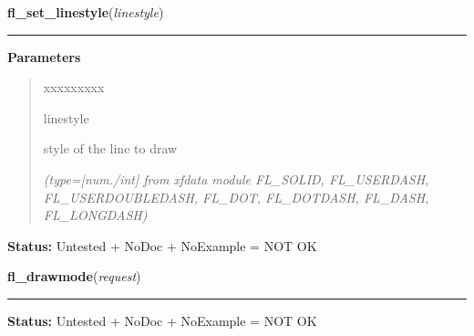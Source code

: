 \hspace{.8\funcindent}\begin{boxedminipage}{\funcwidth}

    \raggedright \textbf{fl\_set\_linestyle}(\textit{linestyle})

    \vspace{-1.5ex}

    \rule{\textwidth}{0.5\fboxrule}
\setlength{\parskip}{2ex}
\setlength{\parskip}{1ex}
      \textbf{Parameters}
      \vspace{-1ex}

      \begin{quote}
        \begin{Ventry}{xxxxxxxxx}

          \item[linestyle]

          style of the line to draw

            {\it (type=[num./int] from xfdata module FL\_SOLID, FL\_USERDASH, FL\_USERDOUBLEDASH, 
FL\_DOT, FL\_DOTDASH, FL\_DASH, FL\_LONGDASH)}

        \end{Ventry}

      \end{quote}

\textbf{Status:} Untested + NoDoc + NoExample = NOT OK



    \end{boxedminipage}

    \label{xformslib:library:fl_drawmode}

    \vspace{0.5ex}

\hspace{.8\funcindent}\begin{boxedminipage}{\funcwidth}

    \raggedright \textbf{fl\_drawmode}(\textit{request})

    \vspace{-1.5ex}

    \rule{\textwidth}{0.5\fboxrule}
\setlength{\parskip}{2ex}
\setlength{\parskip}{1ex}
\textbf{Status:} Untested + NoDoc + NoExample = NOT OK



    \end{boxedminipage}

